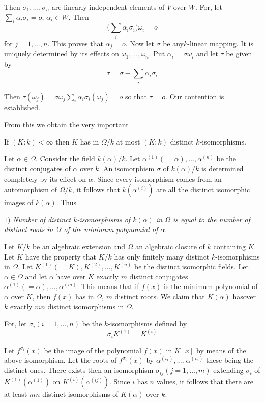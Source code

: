 Then $\sigma_1 , \ldots , \sigma_n$ are linearly independent elements
of $V$ over $W$. For, let $\sum\limits_{i} \alpha_i \sigma_i = o$,
$\alpha_i \in W$. Then 
$$
\bigg( \sum_{i} \alpha_i \sigma_i \bigg) \omega_i = o
$$
for $j = 1, \ldots , n$. This proves that $\alpha_j = o$. Now let
$\sigma$ be any\pageoriginale $k$-linear mapping. It is uniquely
determined by its effects on $\omega_1 , \ldots , \omega_n$. Put
$\alpha _i = \sigma \omega_i$ and let $\tau$ be given by   
$$
\tau = \sigma - \sum_i \alpha_i \sigma_i
$$

Then $\tau (\omega_j ) = \sigma \omega_j \sum_i \alpha_i \sigma_i
(\omega_j ) = o$ so that $\tau = o$. Our contention is established. 

From this we obtain the very important 

\begin{coro*}%
If $(K : k) < \infty$ then $K$ has in $\Omega/k$ at most $(K :
  k)$ distinct $k$-isomorphisms. 
\end{coro*}

Let $\alpha \in \Omega$. Consider the field $k (\alpha )/ k$. Let
$\alpha^{(1)} (= \alpha ), \ldots, \alpha^{(n)}$ be the distinct
conjugates of $\alpha$ over $k$. An isomorphism $\sigma$ of $k
(\alpha)/k$ is determined completely by its effect on $\alpha$. Since
every isomorphism comes from an automorphism of $\Omega/k$, it follows
that $k (\alpha^{(i)})$ are all the distinct isomorphic images of $k
(\alpha)$. Thus  

$1)$ \textit{Number of distinct $k$-isomorphisms of $k (\alpha)$ in
  $\Omega$ is equal to the number of distinct roots in $\Omega$ of the
  minimum polynomial of $\alpha$}. 

Let $K/k$ be an algebraic extension and $\Omega$ an algebraic closure
of $k$ containing $K$. Let $K$ have the property that $K/k$ has only
finitely many distinct $k$-isomorphisms in $\Omega$. Let $K^{(1)} (= K),
K^{(2)} , \ldots ,K^{(n)}$ be the distinct isomorphic fields. Let
$\alpha \in \Omega $ and let $\alpha$ have over $K$ exactly $m$
distinct conjugates $\alpha^{(1)} (= \alpha), \ldots
,\alpha^{(m)}$. This means that if $f (x)$ is the minimum polynomial
of $\alpha$ over $K$, then $f(x)$ has in $\Omega$, $m$ distinct
roots. We claim that $K(\alpha)$ has\pageoriginale over $k$ exactly
$mn$ distinct isomorphisms in $\Omega$.   

For, let $\sigma_i (i = 1, \ldots , n)$ be the $k$-isomorphisms defined
by  
$$
\sigma_i K^{(1)} = K^{(i)}
$$

Let $f^{\sigma_i} (x)$ be the image of the polynomial $f(x)$ in $K[x]$
by means of the above isomorphism. Let the roots of $f^{\sigma_i}(x)$
by $\alpha^{(i_1)} , \ldots , \alpha^{(i_n)}$ these being the
distinct ones. There exists then an isomorphism $\sigma_{ij} (j = 1,
\ldots , m)$ extending $\sigma_i$ of $K^{(1)} ( \alpha^{(1)})$ on $K
^{(i)} ( \alpha^{(ij)})$. Since $i$ has $n$ values, it follows that
there are at least $mn$ distinct isomorphisms of $K(\alpha)$ over $k$.  

